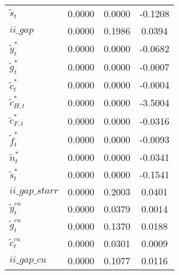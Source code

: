 \begin{center}
\begin{longtable}{lccc}
${\tilde s_t}             $	 & 	       0.0000	 & 	       0.0000	 & 	      -0.1208 \\ 
$ii\_gap                  $	 & 	       0.0000	 & 	       0.1986	 & 	       0.0394 \\ 
${\tilde y_t^*}           $	 & 	       0.0000	 & 	       0.0000	 & 	      -0.0682 \\ 
${\tilde g_t^*}           $	 & 	       0.0000	 & 	       0.0000	 & 	      -0.0007 \\ 
${\tilde c_t^*}           $	 & 	       0.0000	 & 	       0.0000	 & 	      -0.0004 \\ 
${\tilde c_{H,t}^*}       $	 & 	       0.0000	 & 	       0.0000	 & 	      -3.5004 \\ 
${\tilde c_{F,t}^*}       $	 & 	       0.0000	 & 	       0.0000	 & 	      -0.0316 \\ 
${\tilde f_t^*}           $	 & 	       0.0000	 & 	       0.0000	 & 	      -0.0093 \\ 
${\tilde n_t^*}           $	 & 	       0.0000	 & 	       0.0000	 & 	      -0.0341 \\ 
${\tilde s_t^*}           $	 & 	       0.0000	 & 	       0.0000	 & 	      -0.1541 \\ 
$ii\_gap\_starr           $	 & 	       0.0000	 & 	       0.2003	 & 	       0.0401 \\ 
${\tilde y_t^{cu}}        $	 & 	       0.0000	 & 	       0.0379	 & 	       0.0014 \\ 
${\tilde g_t^{cu}}        $	 & 	       0.0000	 & 	       0.1370	 & 	       0.0188 \\ 
${\tilde c_t^{cu}}        $	 & 	       0.0000	 & 	       0.0301	 & 	       0.0009 \\ 
$ii\_gap\_cu              $	 & 	       0.0000	 & 	       0.1077	 & 	       0.0116 \\ 
\end{longtable}
 \end{center}
